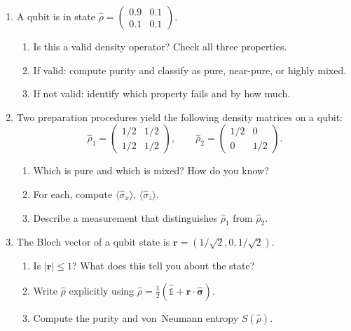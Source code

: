 \documentclass[11pt,a4paper]{article}
\begin{document}
\begin{tcolorbox}[ugprobbox, title={Part B --- Interpretation \hfill\normalfont 3 problems}]

\begin{enumerate}[leftmargin=1.8em, label=\textbf{B\arabic*.}, itemsep=12pt]

\item {}
  A qubit is in state $\hat{\rho}=\begin{pmatrix}0.9&0.1\\0.1&0.1\end{pmatrix}$.
  \begin{enumerate}[label=(\alph*)]
    \item Is this a valid density operator? Check all three properties.
    \item If valid: compute purity and classify as pure, near-pure, or highly mixed.
    \item If not valid: identify which property fails and by how much.
  \end{enumerate}

\item {}
  Two preparation procedures yield the following density matrices on a qubit:
  \[
    \hat{\rho}_1=\begin{pmatrix}1/2&1/2\\1/2&1/2\end{pmatrix},\qquad
    \hat{\rho}_2=\begin{pmatrix}1/2&0\\0&1/2\end{pmatrix}.
  \]
  \begin{enumerate}[label=(\alph*)]
    \item Which is pure and which is mixed? How do you know?
    \item For each, compute $\langle\hat{\sigma}_x\rangle$, $\langle\hat{\sigma}_z\rangle$.
    \item Describe a measurement that distinguishes $\hat{\rho}_1$ from $\hat{\rho}_2$.
  \end{enumerate}

\item {}
  The Bloch vector of a qubit state is $\mathbf{r}=(1/\sqrt{2},0,1/\sqrt{2})$.
  \begin{enumerate}[label=(\alph*)]
    \item Is $|\mathbf{r}|\le 1$? What does this tell you about the state?
    \item Write $\hat{\rho}$ explicitly using $\hat{\rho}=\tfrac{1}{2}(\hat{\mathbb{1}}+\mathbf{r}\cdot\hat{\boldsymbol{\sigma}})$.
    \item Compute the purity and von~Neumann entropy $S(\hat{\rho})$.
  \end{enumerate}

\end{enumerate}
\end{tcolorbox}
\end{document}

